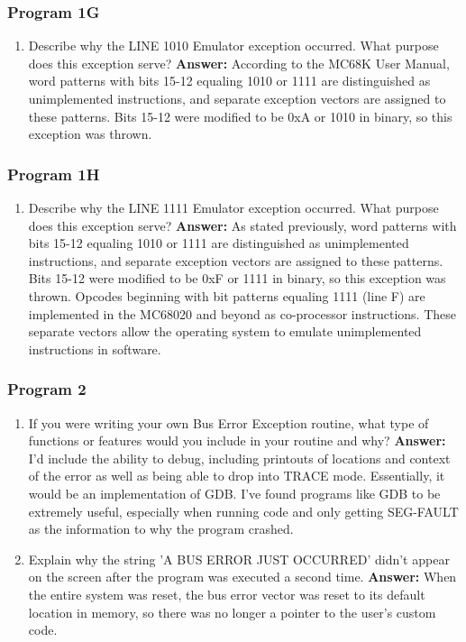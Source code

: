 \documentclass[12pt, twocolumn]{article}
\begin{document}
\subsubsection{Program 1G}
\begin{enumerate}
	\item Describe why the LINE 1010 Emulator exception occurred. What purpose does this exception serve?
	\subitem \hspace{-0.7cm}\textbf{Answer:} According to the MC68K User Manual, word patterns with bits 15-12 equaling 1010 or 1111 are distinguished as unimplemented
	instructions, and separate exception vectors are assigned to these patterns. Bits 15-12 were modified to be 0xA or 1010 in binary, so this exception was thrown.
\end{enumerate}

\subsubsection{Program 1H}
\begin{enumerate}
	\item Describe why the LINE 1111 Emulator exception occurred. What purpose does this exception serve?
	\subitem \hspace{-0.7cm}\textbf{Answer:} As stated previously, word patterns with bits 15-12 equaling 1010 or 1111 are distinguished as unimplemented instructions, and separate exception vectors are assigned to these patterns. Bits 15-12 were modified to be 0xF or 1111 in binary, so this exception was thrown. Opcodes beginning with bit patterns equaling 1111 (line F) are implemented in the MC68020 and beyond as co-processor instructions. These separate vectors allow the operating system to emulate unimplemented instructions in software.
\end{enumerate}

\subsubsection{Program 2}
\begin{enumerate}
	\item If you were writing your own Bus Error Exception routine, what type of functions or features would you include in your routine and why?
	\subitem \hspace{-0.7cm}\textbf{Answer:} I'd include the ability to debug, including printouts of locations and context of the error as well as being able to drop into TRACE mode. Essentially, it would be an implementation of GDB. I've found programs like GDB to be extremely useful, especially when running code and only getting SEG-FAULT as the information to why the program crashed.
	\item Explain why the string 'A BUS ERROR JUST OCCURRED' didn’t appear on the screen after the program was executed a second time.
	\subitem \hspace{-0.7cm}\textbf{Answer:} When the entire system was reset, the bus error vector was reset to its default location in memory, so there was no longer a pointer to the user's custom code.
\end{enumerate}
\end{document}
